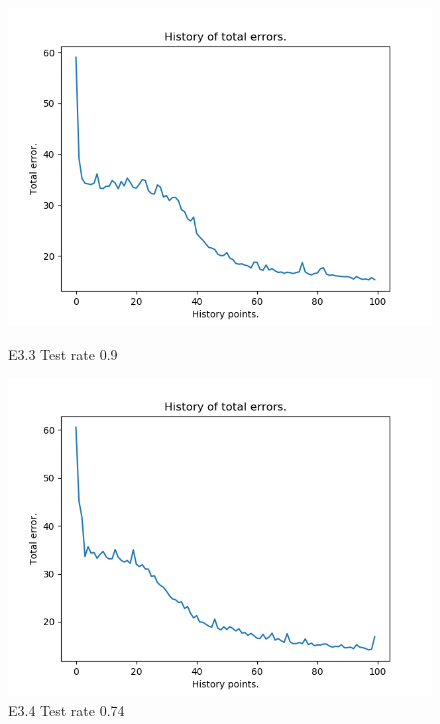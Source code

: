 \documentclass{classrep}
\begin{document}
\begin{figure}[H]
\begin{minipage}{0.5\linewidth}
				\centering
				\includegraphics[scale=0.25]{iris_nn_m7.png}
				\caption{E3.3 Test rate  0.9}
				\label{E3.3}
			\end{minipage}
			\begin{minipage}{0.5\linewidth}
				\centering
				\includegraphics[scale=0.25]{iris_nn_m9.png}
				\caption{E3.4 Test rate  0.74}
				\label{E3.4}
			\end{minipage}
		\end{figure}
		\FloatBarrier
\end{document}
